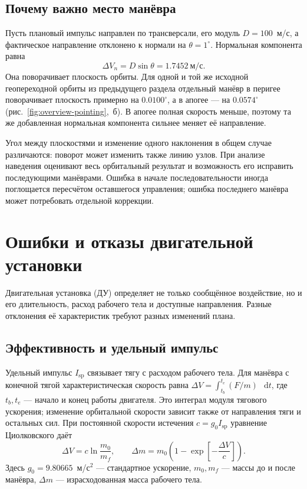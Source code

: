 \documentclass[a4paper,11pt]{article}
\newcommand{\dd}{\mathop{}\!\mathrm d}
\numberwithin{equation}{section}
\begin{document}
\subsection{Почему важно место манёвра}

Пусть плановый импульс направлен по трансверсали, его модуль
$D=100$~м/с, а фактическое направление отклонено к нормали
на $\theta=1^\circ$. Нормальная компонента равна
\[
\Delta V_n=D\sin\theta=1.7452~\text{м/с}.
\]
Она поворачивает плоскость орбиты.
Для одной и той же исходной геопереходной орбиты
из предыдущего раздела отдельный манёвр в перигее поворачивает
плоскость примерно на $0.0100^\circ$,
а в апогее --- на $0.0574^\circ$
(рис.~\ref{fig:overview-pointing},~б).
В апогее полная скорость меньше, поэтому та же добавленная
нормальная компонента сильнее меняет её направление.

Угол между плоскостями и изменение одного наклонения
в общем случае различаются: поворот может изменить также линию узлов.
При анализе наведения оценивают весь орбитальный результат
и возможность его исправить последующими манёврами.
Ошибка в начале последовательности иногда поглощается пересчётом
оставшегося управления; ошибка последнего манёвра
может потребовать отдельной коррекции.
\FloatBarrier

\section{Ошибки и отказы двигательной установки}
\label{sec:propulsion}

Двигательная установка (ДУ) определяет не только сообщённое
воздействие, но и его длительность, расход рабочего тела
и доступные направления. Разные отклонения её характеристик
требуют разных изменений плана.

\subsection{Эффективность и удельный импульс}
\label{sec:isp}

Удельный импульс $I_{\mathrm{sp}}$ связывает тягу с расходом
рабочего тела. Для манёвра с конечной тягой
характеристическая скорость равна
$\Delta V=\int_{t_b}^{t_e}(F/m)\,\dd t$,
где $t_b,t_e$ --- начало и конец работы двигателя.
Это интеграл модуля тягового ускорения; изменение орбитальной
скорости зависит также от направления тяги и остальных сил.
При постоянной скорости истечения
$c=g_0I_{\mathrm{sp}}$ уравнение Циолковского даёт
\begin{equation}
\Delta V=c\ln\frac{m_0}{m_f},\qquad
\Delta m=m_0\left(1-\exp\left[-\frac{\Delta V}{c}\right]\right).
\label{eq:fuel}
\end{equation}
Здесь $g_0=9.80665$~м/с$^2$ --- стандартное ускорение,
$m_0,m_f$ --- массы до и после манёвра,
$\Delta m$ --- израсходованная масса рабочего тела.
\end{document}
